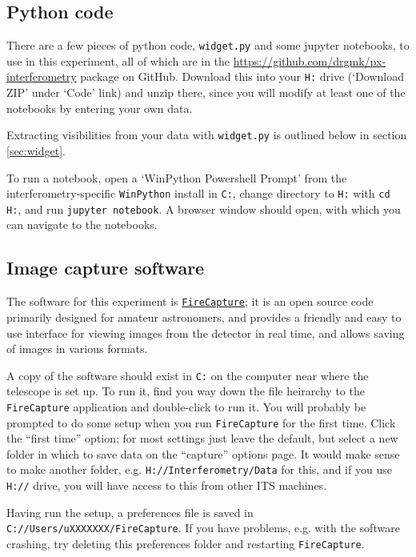 \documentclass[11pt]{article}
\begin{document}
\subsection{Python code}

There are a few pieces of python code, \texttt{widget.py} and some jupyter notebooks, to use in this experiment, all of which are in the \href{https://github.com/drgmk/px-interferometry}{https://github.com/drgmk/px-interferometry} package on GitHub. Download this into your \texttt{H:} drive (`Download ZIP' under `Code' link) and unzip there, since you will modify at least one of the notebooks by entering your own data.

Extracting visibilities from your data with \texttt{widget.py} is outlined below in section \ref{sec:widget}.

To run a notebook, open a `WinPython Powershell Prompt' from the interferometry-specific \texttt{WinPython} install in \texttt{C:}, change directory to \texttt{H:} with \texttt{cd H:}, and run \texttt{jupyter notebook}. A browser window should open, with which you can navigate to the notebooks.

\subsection{Image capture software}\label{sec:software}

The software for this experiment is \href{http://www.firecapture.de/}{\texttt{FireCapture}}; it is an open source code primarily designed for amateur astronomers, and provides a friendly and easy to use interface for viewing images from the detector in real time, and allows saving of images in various formats.

A copy of the software should exist in \texttt{C:} on the computer near where the telescope is set up. To run it, find you way down the file heirarchy to the \texttt{FireCapture} application and double-click to run it. You will probably be prompted to do some setup when you run \texttt{FireCapture} for the first time. Click the ``first time'' option; for most settings just leave the default, but select a new folder in which to save data on the ``capture'' options page. It would make sense to make another folder, e.g. \texttt{H://Interferometry/Data} for this, and if you use \texttt{H://} drive, you will have access to this from other ITS machines.

Having run the setup, a preferences file is saved in \texttt{C://Users/uXXXXXXX/FireCapture}. If you have problems, e.g. with the software crashing, try deleting this preferences folder and restarting \texttt{FireCapture}.
\end{document}
